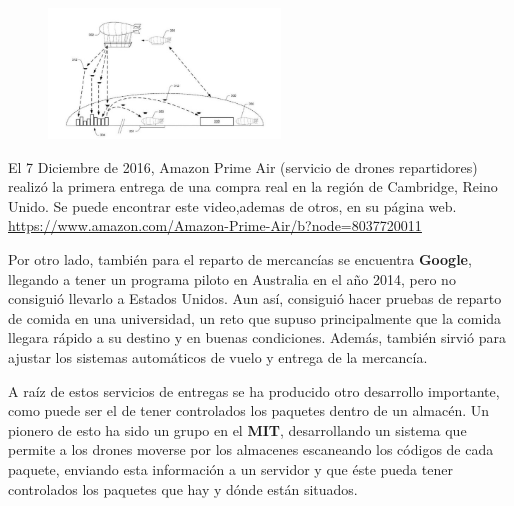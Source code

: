 \begin{figure}[ht]
	\centering
		\includegraphics[width=0.55\textwidth]{imgs/amazon.jpg}
	\label{fig:Esquema de reparto con drones}
\end{figure}

\hspace{1 cm} El 7 Diciembre de 2016, Amazon Prime Air (servicio de drones repartidores) realiz\'o la primera entrega de una compra real en la regi\'on de Cambridge, Reino Unido. Se puede encontrar este video,ademas de otros, en su p\'agina web. \underline{\url{https://www.amazon.com/Amazon-Prime-Air/b?node=8037720011}}

\hspace{1 cm} Por otro lado, tambi\'en para el reparto de mercanc\'ias se encuentra \textbf{Google}, llegando a tener un programa piloto en Australia en el año 2014, pero no consigui\'o llevarlo a Estados Unidos. Aun as\'i, consigui\'o hacer pruebas de reparto de comida en una universidad, un reto que supuso principalmente que la comida llegara r\'apido a su destino y en buenas condiciones. Adem\'as, tambi\'en sirvi\'o para ajustar los sistemas autom\'aticos de vuelo y entrega de la mercanc\'ia. 

\hspace{1 cm} A ra\'iz de estos servicios de entregas se ha producido otro desarrollo importante, como puede ser el de tener controlados los paquetes dentro de un almac\'en. Un pionero de esto ha sido un grupo en el \textbf{MIT}, desarrollando un sistema que permite a los drones moverse por los almacenes escaneando los c\'odigos de cada paquete, enviando esta informaci\'on a un servidor y que \'este pueda tener controlados los paquetes que hay y d\'onde est\'an situados. 

